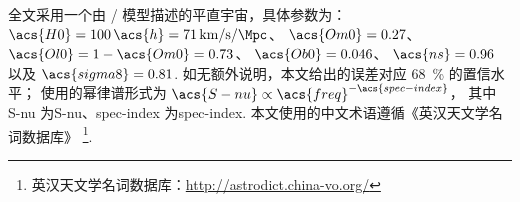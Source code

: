 全文采用一个由 \lcdm/ 模型描述的平直宇宙，具体参数为：
$\acs{H0} = 100\,\acs{h} = \SI{71}{\km\per\second\per\Mpc}$、
$\acs{Om0} = 0.27$、
$\acs{Ol0} = 1 - \acs{Om0} = 0.73$、
$\acs{Ob0} = 0.046$、
$\acs{ns} = 0.96$ 以及 $\acs{sigma8} = 0.81$.
如无额外说明，本文给出的误差对应 \SI{68}{\percent} 的置信水平；
使用的幂律谱形式为 $\acs{S-nu} \propto \acs{freq}^{-\acs{spec-index}}$，
其中 \acs{S-nu} 为\acl{S-nu}、\acs{spec-index} 为\acl{spec-index}.
本文使用的中文术语遵循《英汉天文学名词数据库》%
\footnote{英汉天文学名词数据库：\url{http://astrodict.china-vo.org/}}.


